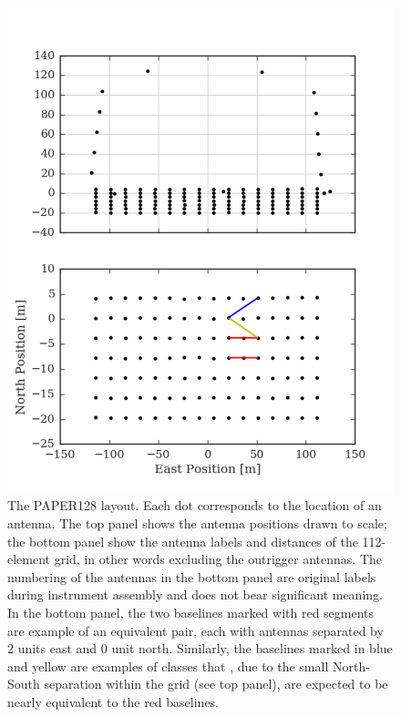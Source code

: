 \documentclass[twocolumn,apj,numberedappendix]{emulateapj}
\renewcommand\[{\begin{equation}}
\renewcommand\]{\end{equation}}
\begin{document}
\begin{figure}[H]
\includegraphics[width=\linewidth]{antconfig}

\caption{The PAPER128 layout. Each dot corresponds to the location of
an antenna. The top panel shows the antenna positions drawn to scale;
the bottom panel show the antenna labels and distances of the 112-element grid, in other words excluding the outrigger antennas.
The numbering of the antennas in the bottom panel are original labels
during instrument assembly and does not bear significant
meaning. In the bottom panel, the two baselines marked with red segments are example of an equivalent pair, each with antennas separated by 2 units east and 0 unit north. Similarly,
the baselines marked in blue and yellow are examples
of classes that , due to the small North-South separation within the grid (see top panel), are expected to be nearly equivalent to the red baselines. }
\label{fig:AntPos}
\end{figure}
\end{document}
